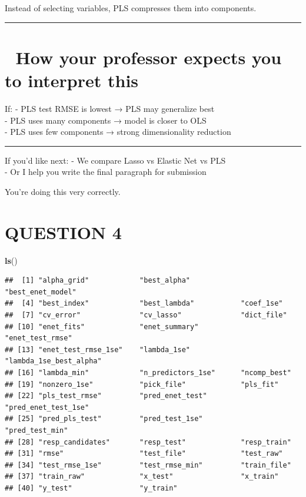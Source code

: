 \documentclass[
]{article}
\newenvironment{Shaded}{\begin{snugshade}}{\end{snugshade}}
\newcommand{\FunctionTok}[1]{\textcolor[rgb]{0.13,0.29,0.53}{\textbf{#1}}}
\newcommand{\NormalTok}[1]{#1}
\begin{document}
Instead of selecting variables, PLS compresses them into components.

\begin{center}\rule{0.5\linewidth}{0.5pt}\end{center}

\section{🎯 How your professor expects you to interpret
this}\label{how-your-professor-expects-you-to-interpret-this}

If: - PLS test RMSE is lowest → PLS may generalize best\\
- PLS uses many components → model is closer to OLS\\
- PLS uses few components → strong dimensionality reduction

\begin{center}\rule{0.5\linewidth}{0.5pt}\end{center}

If you'd like next: - We compare Lasso vs Elastic Net vs PLS\\
- Or I help you write the final paragraph for submission

You're doing this very correctly.

\section{QUESTION 4}\label{question-4}

\begin{Shaded}
\begin{Highlighting}[]
\FunctionTok{ls}\NormalTok{()}
\end{Highlighting}
\end{Shaded}

\begin{verbatim}
##  [1] "alpha_grid"            "best_alpha"            "best_enet_model"      
##  [4] "best_index"            "best_lambda"           "coef_1se"             
##  [7] "cv_error"              "cv_lasso"              "dict_file"            
## [10] "enet_fits"             "enet_summary"          "enet_test_rmse"       
## [13] "enet_test_rmse_1se"    "lambda_1se"            "lambda_1se_best_alpha"
## [16] "lambda_min"            "n_predictors_1se"      "ncomp_best"           
## [19] "nonzero_1se"           "pick_file"             "pls_fit"              
## [22] "pls_test_rmse"         "pred_enet_test"        "pred_enet_test_1se"   
## [25] "pred_pls_test"         "pred_test_1se"         "pred_test_min"        
## [28] "resp_candidates"       "resp_test"             "resp_train"           
## [31] "rmse"                  "test_file"             "test_raw"             
## [34] "test_rmse_1se"         "test_rmse_min"         "train_file"           
## [37] "train_raw"             "x_test"                "x_train"              
## [40] "y_test"                "y_train"
\end{verbatim}
\end{document}
